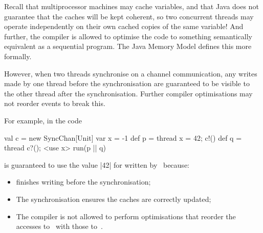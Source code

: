 \documentclass[notes,color]{sepslide0}
\begin{document}




\begin{slide}

Recall that multiprocessor machines may cache variables, and that Java does
not guarantee that the caches will be kept coherent, so two concurrent
threads may operate independently on their own cached copies of the same
variable!  And further, the compiler is allowed to optimise the code to
something semantically equivalent as a sequential program.  The Java Memory
Model
defines this more formally.

However, when two threads synchronise on a channel communication, any writes
made by one thread before the synchronisation are guaranteed to be visible to
the other thread after the synchronisation.  
Further compiler optimisations may not reorder events to break this.

\vfill

\end{slide}


\begin{slide}

For example, in the code
\begin{scala}
val c = new SyncChan[Unit]
var x = -1
def p = thread{ x = 42; c!() }
def q = thread{ c?(); <use x> }
run(p || q)
\end{scala}
%
 is guaranteed to use the value |42| for  written
by~ because:
%
\begin{itemize}
\item 
{} finishes writing before the synchronisation;

\item
The synchronisation ensures the caches are correctly updated;

\item
The compiler is not allowed to perform optimisations that reorder the accesses
to~ with those to~.
\end{itemize}
\end{slide}

\end{document}
